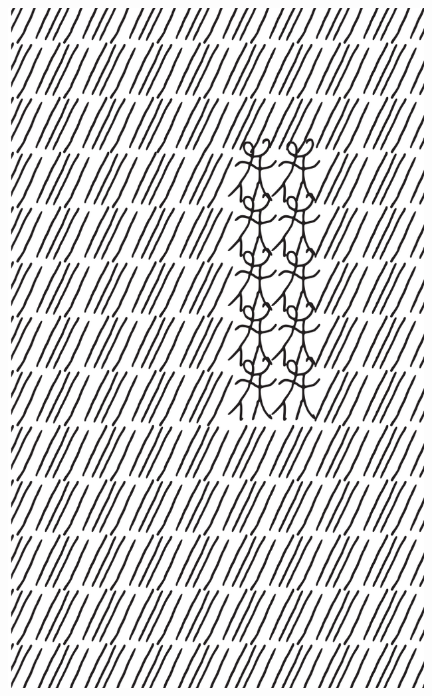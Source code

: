 \makeatletter\@openrightfalse
\movetooddpage
\begin{absolutelynopagebreak}
\begin{vplace}
\begin{figure}[H]
\begin{adjustwidth}{-0.99cm}{}
  \centering
  \vspace*{-1.77cm}
  \hspace*{-0.45cm}
  \includegraphics[width=110mm]{./imgs/img3.pdf}  
  \hfill
\end{adjustwidth}

\thispagestyle{empty}

\end{figure}
\end{vplace}

\end{absolutelynopagebreak}

